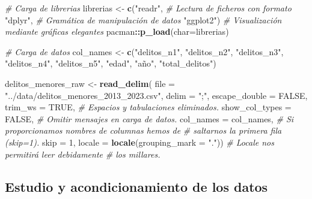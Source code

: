 \documentclass[,,,,pdftex]{Definitions/mdpi}
\newenvironment{Shaded}{\begin{snugshade}}{\end{snugshade}}
\newcommand{\AttributeTok}[1]{\textcolor[rgb]{0.13,0.29,0.53}{#1}}
\newcommand{\CommentTok}[1]{\textcolor[rgb]{0.56,0.35,0.01}{\textit{#1}}}
\newcommand{\ConstantTok}[1]{\textcolor[rgb]{0.56,0.35,0.01}{#1}}
\newcommand{\DecValTok}[1]{\textcolor[rgb]{0.00,0.00,0.81}{#1}}
\newcommand{\FunctionTok}[1]{\textcolor[rgb]{0.13,0.29,0.53}{\textbf{#1}}}
\newcommand{\NormalTok}[1]{#1}
\newcommand{\OtherTok}[1]{\textcolor[rgb]{0.56,0.35,0.01}{#1}}
\newcommand{\SpecialCharTok}[1]{\textcolor[rgb]{0.81,0.36,0.00}{\textbf{#1}}}
\newcommand{\StringTok}[1]{\textcolor[rgb]{0.31,0.60,0.02}{#1}}
\begin{document}
\begin{Shaded}
\begin{Highlighting}[]
\CommentTok{\# Carga de librerias}
\NormalTok{librerias }\OtherTok{\textless{}{-}} \FunctionTok{c}\NormalTok{(}\StringTok{"readr"}\NormalTok{,       }\CommentTok{\# Lectura de ficheros con formato}
               \StringTok{"dplyr"}\NormalTok{,       }\CommentTok{\# Gramática de manipulación de datos}
               \StringTok{"ggplot2"}\NormalTok{)     }\CommentTok{\# Visualización mediante gráficas elegantes}
\NormalTok{pacman}\SpecialCharTok{::}\FunctionTok{p\_load}\NormalTok{(}\AttributeTok{char=}\NormalTok{librerias)}

\CommentTok{\# Carga de datos}
\NormalTok{col\_names }\OtherTok{\textless{}{-}} \FunctionTok{c}\NormalTok{(}\StringTok{"delitos\_n1"}\NormalTok{, }\StringTok{"delitos\_n2"}\NormalTok{, }\StringTok{"delitos\_n3"}\NormalTok{,}
               \StringTok{"delitos\_n4"}\NormalTok{, }\StringTok{"delitos\_n5"}\NormalTok{, }\StringTok{"edad"}\NormalTok{,}
               \StringTok{"año"}\NormalTok{, }\StringTok{"total\_delitos"}\NormalTok{)}

\NormalTok{delitos\_menores\_raw }\OtherTok{\textless{}{-}} \FunctionTok{read\_delim}\NormalTok{(}
  \AttributeTok{file =} \StringTok{"../data/delitos\_menores\_2013\_2023.csv"}\NormalTok{, }
  \AttributeTok{delim =} \StringTok{";"}\NormalTok{,}
  \AttributeTok{escape\_double =} \ConstantTok{FALSE}\NormalTok{,}
  \AttributeTok{trim\_ws =} \ConstantTok{TRUE}\NormalTok{,                        }\CommentTok{\# Espacios y tabulaciones eliminados.}
  \AttributeTok{show\_col\_types =} \ConstantTok{FALSE}\NormalTok{,                }\CommentTok{\# Omitir mensajes en carga de datos.}
  \AttributeTok{col\_names =}\NormalTok{ col\_names,                 }\CommentTok{\# Si proporcionamos nombres de columnas hemos de}
                                         \CommentTok{\# saltarnos la primera fila (skip=1).}
  \AttributeTok{skip =} \DecValTok{1}\NormalTok{,}
  \AttributeTok{locale =} \FunctionTok{locale}\NormalTok{(}\AttributeTok{grouping\_mark =} \StringTok{"."}\NormalTok{))  }\CommentTok{\# Locale nos permitirá leer debidamente}
                                         \CommentTok{\# los millares.}
\end{Highlighting}
\end{Shaded}

\subsection{Estudio y acondicionamiento de los
datos}\label{estudio-y-acondicionamiento-de-los-datos}
\end{document}
